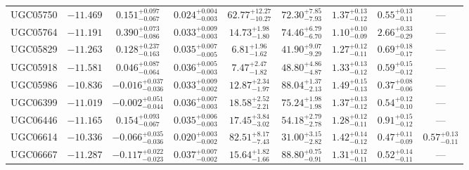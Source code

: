 \documentclass[twocolumn,tighten]{aastex63}
\begin{document}
\begin{table}
\begin{center}
\begin{tabular}{lcccccccc}
   UGC05750 & $ -11.469 $ & $ 0.151 _{ -0.067 } ^{ + 0.097 } $ & $ 0.024 _{ -0.003 } ^{ + 0.004 } $ & $ 62.77 _{ -10.27 } ^{ + 12.27 } $ & $ 72.30 _{ -7.93 } ^{ + 7.85 } $ & $ 1.37 _{ -0.12 } ^{ + 0.13 } $ & $ 0.55 _{ -0.11 } ^{ + 0.13 } $ & --- \\  
   UGC05764 & $ -11.191 $ & $ 0.390 _{ -0.086 } ^{ + 0.073 } $ & $ 0.033 _{ -0.003 } ^{ + 0.009 } $ & $ 14.73 _{ -1.80 } ^{ + 1.98 } $ & $ 74.46 _{ -6.70 } ^{ + 6.79 } $ & $ 1.10 _{ -0.09 } ^{ + 0.10 } $ & $ 2.66 _{ -0.29 } ^{ + 0.33 } $ & --- \\  
   UGC05829 & $ -11.263 $ & $ 0.128 _{ -0.163 } ^{ + 0.237 } $ & $ 0.035 _{ -0.005 } ^{ + 0.007 } $ & $ 6.81 _{ -1.62 } ^{ + 1.96 } $ & $ 41.90 _{ -9.29 } ^{ + 9.07 } $ & $ 1.27 _{ -0.11 } ^{ + 0.12 } $ & $ 0.69 _{ -0.17 } ^{ + 0.18 } $ & --- \\  
   UGC05918 & $ -11.581 $ & $ 0.046 _{ -0.064 } ^{ + 0.087 } $ & $ 0.036 _{ -0.003 } ^{ + 0.005 } $ & $ 7.47 _{ -1.82 } ^{ + 2.47 } $ & $ 48.80 _{ -4.87 } ^{ + 4.86 } $ & $ 1.33 _{ -0.12 } ^{ + 0.13 } $ & $ 0.59 _{ -0.12 } ^{ + 0.15 } $ & --- \\  
   UGC05986 & $ -10.836 $ & $ -0.016 _{ -0.036 } ^{ + 0.037 } $ & $ 0.033 _{ -0.002 } ^{ + 0.009 } $ & $ 12.87 _{ -1.97 } ^{ + 2.34 } $ & $ 88.04 _{ -2.13 } ^{ + 1.37 } $ & $ 1.49 _{ -0.13 } ^{ + 0.15 } $ & $ 0.37 _{ -0.06 } ^{ + 0.08 } $ & --- \\  
   UGC06399 & $ -11.019 $ & $ -0.002 _{ -0.044 } ^{ + 0.051 } $ & $ 0.036 _{ -0.003 } ^{ + 0.007 } $ & $ 18.58 _{ -2.21 } ^{ + 2.52 } $ & $ 75.24 _{ -1.98 } ^{ + 1.98 } $ & $ 1.37 _{ -0.12 } ^{ + 0.13 } $ & $ 0.54 _{ -0.10 } ^{ + 0.12 } $ & --- \\  
   UGC06446 & $ -11.165 $ & $ 0.154 _{ -0.067 } ^{ + 0.093 } $ & $ 0.035 _{ -0.003 } ^{ + 0.006 } $ & $ 17.45 _{ -3.02 } ^{ + 3.84 } $ & $ 54.18 _{ -2.78 } ^{ + 2.79 } $ & $ 1.28 _{ -0.11 } ^{ + 0.12 } $ & $ 0.91 _{ -0.12 } ^{ + 0.15 } $ & --- \\  
   UGC06614 & $ -10.336  $ & $ -0.066 _{ -0.036 } ^{ + 0.035 } $ & $ 0.020 _{ -0.002 } ^{ + 0.003 } $ & $ 82.51 _{ -7.43 } ^{ + 8.17 } $ & $ 31.00 _{ -2.82 } ^{ + 3.15 } $ & $ 1.42 _{ -0.12 } ^{ + 0.14 } $ & $ 0.47 _{ -0.09 } ^{ + 0.11 } $ & $ 0.57 _{ -0.11 } ^{ + 0.13 } $  \\  
   UGC06667 & $ -11.287 $ & $ -0.117 _{ -0.023 } ^{ + 0.022 } $ & $ 0.037 _{ -0.002 } ^{ + 0.007 } $ & $ 15.64 _{ -1.66 } ^{ + 1.82 } $ & $ 88.80 _{ -0.91 } ^{ + 0.75 } $ & $ 1.31 _{ -0.11 } ^{ + 0.12 } $ & $ 0.52 _{ -0.11 } ^{ + 0.14 } $ & --- \\  

\end{tabular}
\end{center}
\end{table}
\end{document}

